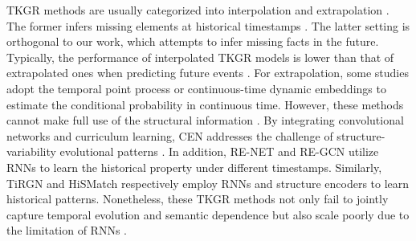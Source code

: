 \documentclass[sigconf,natbib=true]{acmart}
\begin{document}
TKGR methods are usually categorized into interpolation and extrapolation \cite{tkgc-survey}. The former infers missing elements at historical timestamps \cite{TTransE, TA-transE, TNTComplEx, DE-SimplE}.  The latter setting is orthogonal to our work, which attempts to infer missing facts in the future. Typically, the performance of interpolated TKGR models is lower than that of extrapolated ones when predicting future events  \cite{TTransE, TNTComplEx, TA-transE}.
For extrapolation,  some studies \cite{Know-Evolve, Hawkes, DyRep, TANGO} adopt the temporal point process or continuous-time dynamic embeddings to estimate the conditional probability in continuous time. However, these methods cannot make full use of the structural information \cite{RE-GCN}. By integrating convolutional networks and curriculum learning, CEN addresses the challenge of structure-variability evolutional patterns \cite{CEN}. In addition, RE-NET \cite{RE-NET} and RE-GCN \cite{RE-GCN} utilize RNNs to learn the historical property under different timestamps. Similarly,  TiRGN \cite{TiRGN} and HiSMatch \cite{HiSMatch} respectively employ RNNs and structure encoders to learn historical patterns. Nonetheless, these TKGR methods not only fail to jointly capture temporal evolution and semantic dependence but also scale poorly due to the limitation of RNNs \cite{attengraph}. 

\end{document}

